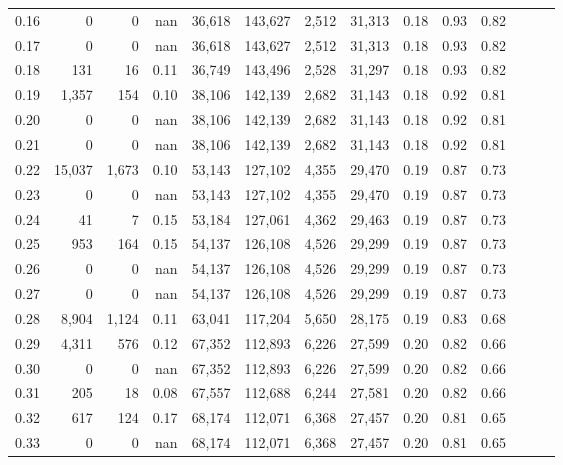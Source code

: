 \begin{tabular}{rrrrrrrrrrrrrr}
0.16 &       0 &      0 &   nan &   36,618 &  143,627 &   2,512 &  31,313 &  0.18 &  0.93 &      0.82 \\
0.17 &       0 &      0 &   nan &   36,618 &  143,627 &   2,512 &  31,313 &  0.18 &  0.93 &      0.82 \\
0.18 &     131 &     16 &  0.11 &   36,749 &  143,496 &   2,528 &  31,297 &  0.18 &  0.93 &      0.82 \\
0.19 &   1,357 &    154 &  0.10 &   38,106 &  142,139 &   2,682 &  31,143 &  0.18 &  0.92 &      0.81 \\
0.20 &       0 &      0 &   nan &   38,106 &  142,139 &   2,682 &  31,143 &  0.18 &  0.92 &      0.81 \\
0.21 &       0 &      0 &   nan &   38,106 &  142,139 &   2,682 &  31,143 &  0.18 &  0.92 &      0.81 \\
0.22 &  15,037 &  1,673 &  0.10 &   53,143 &  127,102 &   4,355 &  29,470 &  0.19 &  0.87 &      0.73 \\
0.23 &       0 &      0 &   nan &   53,143 &  127,102 &   4,355 &  29,470 &  0.19 &  0.87 &      0.73 \\
0.24 &      41 &      7 &  0.15 &   53,184 &  127,061 &   4,362 &  29,463 &  0.19 &  0.87 &      0.73 \\
0.25 &     953 &    164 &  0.15 &   54,137 &  126,108 &   4,526 &  29,299 &  0.19 &  0.87 &      0.73 \\
0.26 &       0 &      0 &   nan &   54,137 &  126,108 &   4,526 &  29,299 &  0.19 &  0.87 &      0.73 \\
0.27 &       0 &      0 &   nan &   54,137 &  126,108 &   4,526 &  29,299 &  0.19 &  0.87 &      0.73 \\
0.28 &   8,904 &  1,124 &  0.11 &   63,041 &  117,204 &   5,650 &  28,175 &  0.19 &  0.83 &      0.68 \\
0.29 &   4,311 &    576 &  0.12 &   67,352 &  112,893 &   6,226 &  27,599 &  0.20 &  0.82 &      0.66 \\
0.30 &       0 &      0 &   nan &   67,352 &  112,893 &   6,226 &  27,599 &  0.20 &  0.82 &      0.66 \\
0.31 &     205 &     18 &  0.08 &   67,557 &  112,688 &   6,244 &  27,581 &  0.20 &  0.82 &      0.66 \\
0.32 &     617 &    124 &  0.17 &   68,174 &  112,071 &   6,368 &  27,457 &  0.20 &  0.81 &      0.65 \\
0.33 &       0 &      0 &   nan &   68,174 &  112,071 &   6,368 &  27,457 &  0.20 &  0.81 &      0.65 \\

\end{tabular}
